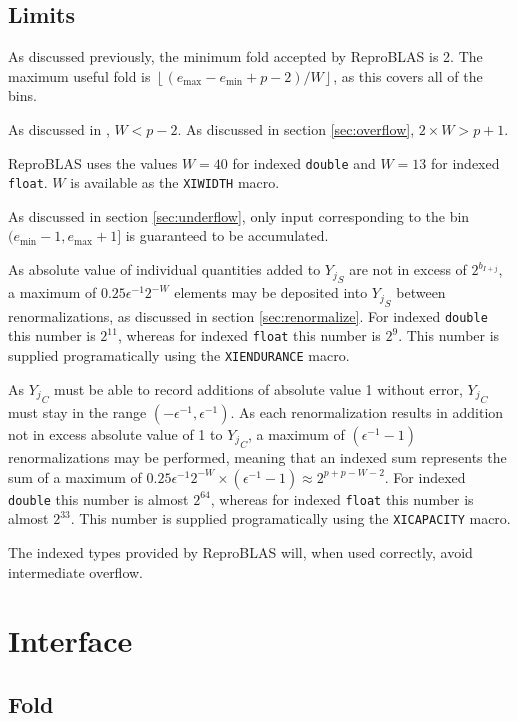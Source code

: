\documentclass[12pt]{article}
\providecommand{\floor}[1]{\left \lfloor #1 \right \rfloor }
\providecommand{\min}{\ensuremath{\text{min}}}
\providecommand{\max}{\ensuremath{\text{max}}}
\theoremstyle{plain}
\begin{document}
  \subsection{Limits}
    \label{sec:limits}
    As discussed previously, the minimum fold accepted by ReproBLAS is 2. The maximum useful fold is $\floor{(e_{\max} - e_{\min} + p - 2)/W}$, as this covers all of the bins.

    As discussed in \cite{repsum}, $W < p - 2$. As discussed in section \ref{sec:overflow}, $2\times W > p + 1$.

    ReproBLAS uses the values $W = 40$ for indexed \verb|double| and $W = 13$ for indexed \verb|float|. $W$ is available as the \verb|XIWIDTH| macro.

    As discussed in section \ref{sec:underflow}, only input corresponding to the bin $(e_{\min} - 1, e_{\max} + 1]$ is guaranteed to be accumulated.

    As absolute value of individual quantities added to ${Y_j}_S$ are not in excess of $2^{b_{I + j}}$, a maximum of $0.25\epsilon^{-1}2^{-W}$ elements may be deposited into ${Y_j}_S$ between renormalizations, as discussed in section \ref{sec:renormalize}. For indexed \verb|double| this number is $2^{11}$, whereas for indexed \verb|float| this number is $2^9$. This number is supplied programatically using the \verb|XIENDURANCE| macro.

    As ${Y_j}_C$ must be able to record additions of absolute value 1 without error, ${Y_j}_C$ must stay in the range $(-\epsilon^{-1}, \epsilon^{-1})$. As each renormalization results in addition not in excess absolute value of 1 to ${Y_j}_C$, a maximum of $(\epsilon^{-1} - 1)$ renormalizations may be performed, meaning that an indexed sum represents the sum of a maximum of $0.25\epsilon^{-1}2^{-W} \times (\epsilon^{-1} - 1) \approx 2^{p + p - W - 2}$. For indexed \verb|double| this number is almost $2^64$, whereas for indexed \verb|float| this number is almost $2^33$. This number is supplied programatically using the \verb|XICAPACITY| macro.

    The indexed types provided by ReproBLAS will, when used correctly, avoid intermediate overflow.

\section{Interface}
  \subsection{Fold}
\end{document}
